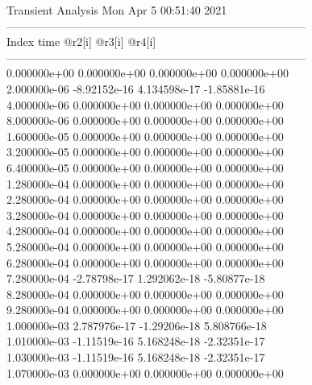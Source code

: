                                    Transient Analysis  Mon Apr  5 00:51:40  2021\\ \hline
--------------------------------------------------------------------------------\\ \hline
Index   time            @r2[i]          @r3[i]          @r4[i]          \\ \hline
--------------------------------------------------------------------------------\\ 	0.000000e+00	0.000000e+00	0.000000e+00	0.000000e+00	\\ 	2.000000e-06	-8.92152e-16	4.134598e-17	-1.85881e-16	\\ 	4.000000e-06	0.000000e+00	0.000000e+00	0.000000e+00	\\ 	8.000000e-06	0.000000e+00	0.000000e+00	0.000000e+00	\\ 	1.600000e-05	0.000000e+00	0.000000e+00	0.000000e+00	\\ 	3.200000e-05	0.000000e+00	0.000000e+00	0.000000e+00	\\ 	6.400000e-05	0.000000e+00	0.000000e+00	0.000000e+00	\\ 	1.280000e-04	0.000000e+00	0.000000e+00	0.000000e+00	\\ 	2.280000e-04	0.000000e+00	0.000000e+00	0.000000e+00	\\ 	3.280000e-04	0.000000e+00	0.000000e+00	0.000000e+00	\\ 	4.280000e-04	0.000000e+00	0.000000e+00	0.000000e+00	\\ 	5.280000e-04	0.000000e+00	0.000000e+00	0.000000e+00	\\ 	6.280000e-04	0.000000e+00	0.000000e+00	0.000000e+00	\\ 	7.280000e-04	-2.78798e-17	1.292062e-18	-5.80877e-18	\\ 	8.280000e-04	0.000000e+00	0.000000e+00	0.000000e+00	\\ 	9.280000e-04	0.000000e+00	0.000000e+00	0.000000e+00	\\ 	1.000000e-03	2.787976e-17	-1.29206e-18	5.808766e-18	\\ 	1.010000e-03	-1.11519e-16	5.168248e-18	-2.32351e-17	\\ 	1.030000e-03	-1.11519e-16	5.168248e-18	-2.32351e-17	\\ 	1.070000e-03	0.000000e+00	0.000000e+00	0.000000e+00	\\ \hline
